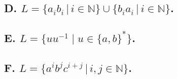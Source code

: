 \documentclass{article}
\begin{document}
        \newpage %
        \subsection*{D. $L = \{a_i b_i \,|\, i \in \mathbb{N}\} \cup \{b_i a_i \,|\, i \in \mathbb{N\}}$.}
        \begin{flushleft}
            \begin{enumerate}

            \end{enumerate}
        \end{flushleft}
        \newpage %
        \subsection*{E. $L = \{uu^{-1} \mid u \in \{a, b\}^*\}$.}
        \begin{flushleft}
            \begin{enumerate}
                
            \end{enumerate}
        \end{flushleft}

        \newpage %
        \subsection*{F. $L = \{a^i b^j c^{i+j} \, | \, i, j \in \mathbb{N}\}$.}
        \begin{flushleft}
            \begin{enumerate}
                
            \end{enumerate}
        \end{flushleft}
    
\end{document}
